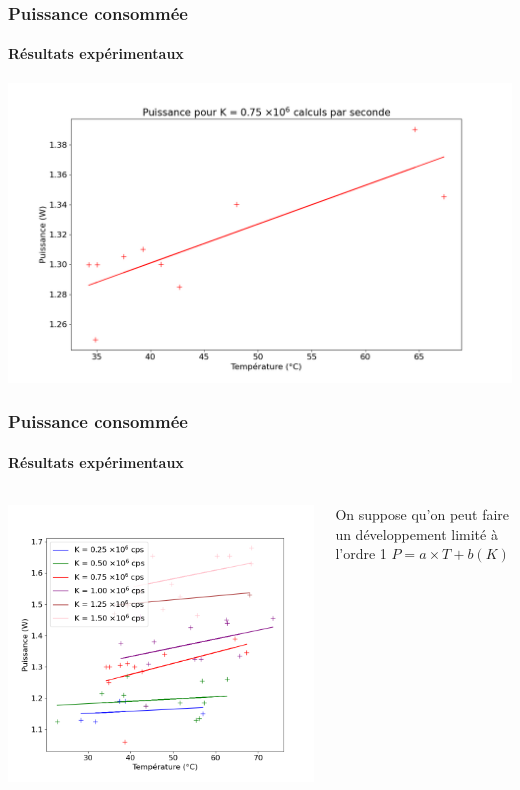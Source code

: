 \documentclass[a4paper,11pt]{beamer}
\begin{document}
\begin{frame}
    \frametitle{Puissance consommée}
    \framesubtitle{Résultats expérimentaux}

    \includegraphics[width=\textwidth]{difference_en_temperature.png}
\end{frame}

\begin{frame}
    \frametitle{Puissance consommée}
    \framesubtitle{Résultats expérimentaux}

    \begin{columns}
        \begin{column}{.7\textwidth}
            \includegraphics[width=\textwidth]{difference_en_calculs.png}
        \end{column}
        \begin{column}{.3\textwidth}
            On suppose qu'on peut faire un développement limité à l'ordre 1
            $P = a\times T + b(K)$
        \end{column}
    \end{columns}
\end{frame}
\end{document}
